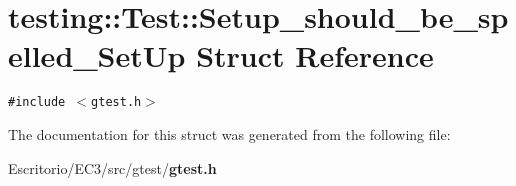 \section{testing::Test::Setup\_\-should\_\-be\_\-spelled\_\-SetUp Struct Reference}
\label{structtesting_1_1Test_1_1Setup__should__be__spelled__SetUp}
{\tt \#include $<$gtest.h$>$}



The documentation for this struct was generated from the following file:\begin{CompactItemize}
\item 
Escritorio/EC3/src/gtest/{\bf gtest.h}\end{CompactItemize}
